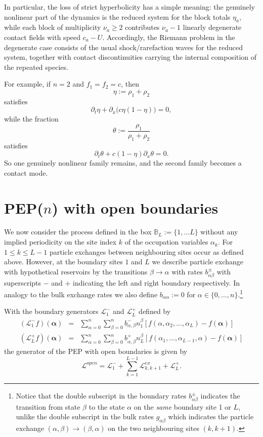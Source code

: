 \documentclass[12pt]{article}
\newcommand{\balpha}{\boldsymbol{\alpha}}
\begin{document}
In particular, the loss of strict hyperbolicity has a simple meaning:
the genuinely nonlinear part of the dynamics is the reduced system for the
block totals $\eta_a$, while each block of multiplicity $\nu_a\ge2$
contributes $\nu_a-1$ linearly degenerate contact fields with speed
$c_a-U$. Accordingly, the Riemann problem in the degenerate case consists
of the usual shock/rarefaction waves for the reduced system, together with
contact discontinuities carrying the internal composition of the repeated
species.

For example, if $n=2$ and $f_1=f_2=c$, then
\[
\eta:=\rho_1+\rho_2
\]
satisfies
\[
\partial_t \eta+\partial_x\bigl(c\eta(1-\eta)\bigr)=0,
\]
while the fraction
\[
\theta:=\frac{\rho_1}{\rho_1+\rho_2}
\]
satisfies
\[
\partial_t \theta+c(1-\eta)\partial_x\theta=0.
\]
So one genuinely nonlinear family remains, and the second family becomes
a contact mode.





\section{PEP($n$) with open boundaries}
\label{open}
We now consider the process defined in the box $\mathbb{B}_L:=\{1,\dots L\}$ without any implied periodicity
on the site index $k$ of the occupation variables $\alpha_k$.
For $1\leq k \leq L-1$ particle exchanges between neighbouring sites
occur as defined above. However, at the boundary sites $1$ and
$L$
we describe particle exchange with hypothetical reservoirs
by the transitions $\beta \to \alpha$ with rates $b_{\alpha\beta}^{\pm}$
with superscripts $-$ and $+$ indicating the left and right boundary 
respectively. In analogy to the bulk exchange rates we also define
$b_{\alpha\alpha}:=0$ for $\alpha\in\{0,\dots,n\}$.\footnote{
Notice that the double subscript in the boundary rates
$b_{\alpha\beta}^{\pm}$ indicates the transition from state $\beta$
to the state $\alpha$ on the {\it same} boundary site 1 or $L$,
unlike the double subscript in the bulk rates $g_{\alpha\beta}$
which indicates the particle exchange $(\alpha,\beta) \to (\beta,\alpha)$
on the two neighbouring sites $(k,k+1)$.}




With the boundary generators $\mathcal{L}^{-}_{1}$ and $\mathcal{L}^{+}_{L}$
defined by
\begin{eqnarray}
(\mathcal{L}^{-}_1 f) (\balpha) & = &
 \sum_{\alpha=0}^n  \sum_{\beta=0}^n b_{\alpha,\beta}^{-} n^{\beta}_{1}
[ f(\alpha,\alpha_2,\dots,\alpha_L) - f(\balpha) ]
\label{genPEPm} \\
(\mathcal{L}^{+}_{L} f) (\balpha) & = &
 \sum_{\alpha=0}^n  \sum_{\beta=0}^n b_{\alpha,\beta}^{+} n^{\beta}_{L}
[ f(\alpha_1,\dots,\alpha_{L-1},\alpha) - f(\balpha) ]
\label{genPEPp}
 \end{eqnarray}
the generator of the PEP with open boundaries is given by
\begin{equation}
\mathcal{L}^{open}  = \mathcal{L}^{-}_1 
+ \sum_{k=1}^{L-1} \mathcal{L}^{ex}_{k,k+1} + \mathcal{L}^{+}_{L} .
\end{equation}
\end{document}
